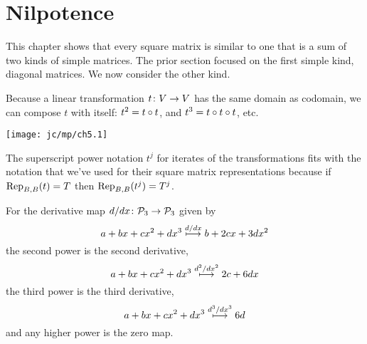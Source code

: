 \section{Nilpotence}
This chapter shows that every square matrix is similar to one
that is a sum of two kinds of simple matrices.
The prior section
focused on the first simple kind, diagonal matrices.
We now consider the other kind.










Because a linear transformation $\map{t}{V}{V}$ has the same domain as
codomain, we can
compose $t$ with itself: 
\( t^2=\composed{t}{t} \), 
and \( t^3=\composed{t}{\composed{t}{t}} \), 
etc. %
\begin{center}
  \texttt{[image: jc/mp/ch5.1]}
\end{center}
The superscript
power notation $t^j$ for iterates of the transformations 
fits with 
the notation that we've used for their square matrix representations
because if $\rep{t}{B,B}=T$ then \( \rep{t^j}{B,B}=T^j \).


\begin{example} \label{ex:DerivIter}
For the derivative map \( \map{d/dx}{\polyspace_3}{\polyspace_3} \)
given by 
\begin{equation*}
  a+bx+cx^2+dx^3\xmapsunder{d/dx} b+2cx+3dx^2
\end{equation*}
the second power is the second derivative,
\begin{equation*}
  a+bx+cx^2+dx^3\xmapsunder{d^2/dx^2} 2c+6dx 
\end{equation*}
the third power is the third derivative,
\begin{equation*}
  a+bx+cx^2+dx^3\xmapsunder{d^3/dx^3} 6d 
\end{equation*}
and any higher power is the zero map.
\end{example}

